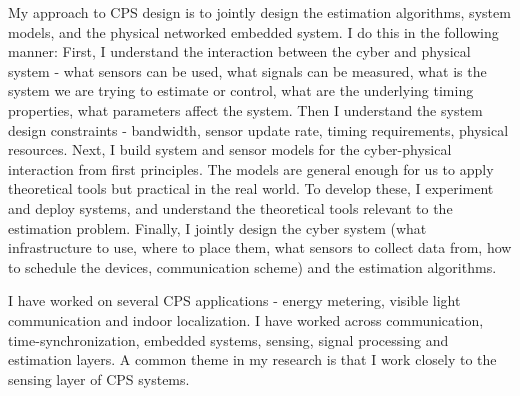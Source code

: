 \documentclass[10pt]{article}
\begin{document}
My approach to CPS design is to jointly design the estimation algorithms, system models, and the physical networked embedded system. I do this in the following manner: First, I understand the interaction between the cyber and physical system - what sensors can be used, what signals can be measured, what is the system we are trying to estimate or control, what are the underlying timing properties, what parameters affect the system. Then I understand the system design constraints - bandwidth, sensor update rate, timing requirements, physical resources. Next, I build system and sensor models for the cyber-physical interaction from first principles. The models are general enough for us to apply theoretical tools but practical in the real world. To develop these, I experiment and deploy systems, and understand the theoretical tools relevant to the estimation problem. Finally, I jointly design the cyber system (what infrastructure to use, where to place them, what sensors to collect data from, how to schedule the devices, communication scheme) and the estimation algorithms. 

I have worked on several CPS applications - energy metering, visible light communication and indoor localization. I have worked across communication, time-synchronization, embedded systems, sensing, signal processing and estimation layers. A common theme in my research is that I work closely to the sensing layer of CPS systems.\\ %




\end{document}
